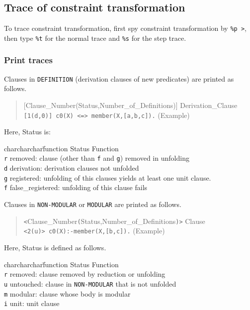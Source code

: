 \subsection{Trace of constraint transformation}
To trace constraint transformation, first spy constraint
transformation by \verb+%p >+, then type \verb+%t+ for the 
normal trace and  \verb+%s+ for the step trace.

\subsubsection{Print traces}
Clauses in {\tt DEFINITION} (derivation clauses of new predicates) are
printed as follows.
\begin{quote}
[Clause\_Number(Status,Number\_of\_Definitions)] Derivation\_Clause\\
{\tt [1(d,0)] c0(X) <=> member(X,[a,b,c]).} (Example)
\end{quote}
Here, Status is:
\begin{tabbing}
charcharchar\=function \kill
Status\> Function\\
{\tt r} \> removed: clause (other than {\tt f} and {\tt g}) 
	removed in unfolding\\
{\tt d} \> derivation: derivation clauses not unfolded\\
{\tt g} \> registered: unfolding of this clauses yields at least one
unit clause.\\
{\tt f} \> false\_registered: unfolding of this clause fails\\
\end{tabbing}

Clauses in {\tt NON-MODULAR} or {\tt MODULAR} are printed as follows.

\begin{quote}
\verb+<+Clause\_Number{\tt (}Status,Number\_of\_Definitions{\tt )}\verb+>+ Clause\\
{\tt <2(u)> c0(X):-member(X,[b,c]).} (Example)
\end{quote}
Here, Status is defined as follows.
\begin{tabbing}
charcharchar\=function \kill
Status \> Function\\
{\tt r} \> removed: clause removed by reduction or unfolding\\
{\tt u} \> untouched: clause in {\tt NON-MODULAR} that is not unfolded\\
{\tt m} \> modular: clause whose body is modular\\
{\tt i} \> unit: unit clause\\
\end{tabbing}

